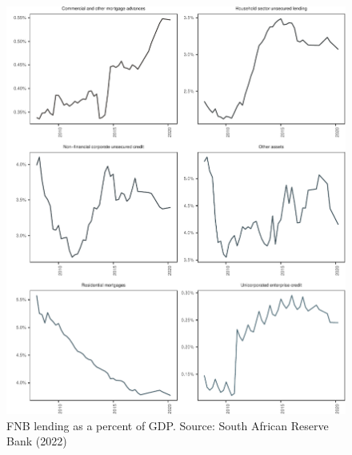 \documentclass[
]{article}
\begin{document}
\begin{figure}[H]

\includegraphics{Bank_capital_and_bank_lending_files/figure-latex/ba900gdpfnb-1} \hfill{}

\caption{FNB lending as a percent of GDP. Source: South African Reserve Bank (2022)}\label{fig:ba900gdpfnb}
\end{figure}
\end{document}
